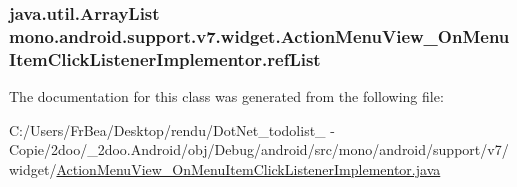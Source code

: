 \hypertarget{classmono_1_1android_1_1support_1_1v7_1_1widget_1_1_action_menu_view___on_menu_item_click_listener_implementor_366b7365107c33ee2717b225132fc60b}{
\subsubsection[{refList}]{\setlength{\rightskip}{0pt plus 5cm}java.util.ArrayList {\bf mono.android.support.v7.widget.ActionMenuView\_\-OnMenuItemClickListenerImplementor.refList}}}
\label{classmono_1_1android_1_1support_1_1v7_1_1widget_1_1_action_menu_view___on_menu_item_click_listener_implementor_366b7365107c33ee2717b225132fc60b}




The documentation for this class was generated from the following file:\begin{CompactItemize}
\item 
C:/Users/FrBea/Desktop/rendu/DotNet\_\-todolist\_ - Copie/2doo/\_\-2doo.Android/obj/Debug/android/src/mono/android/support/v7/widget/\hyperlink{_action_menu_view___on_menu_item_click_listener_implementor_8java}{ActionMenuView\_\-OnMenuItemClickListenerImplementor.java}\end{CompactItemize}
